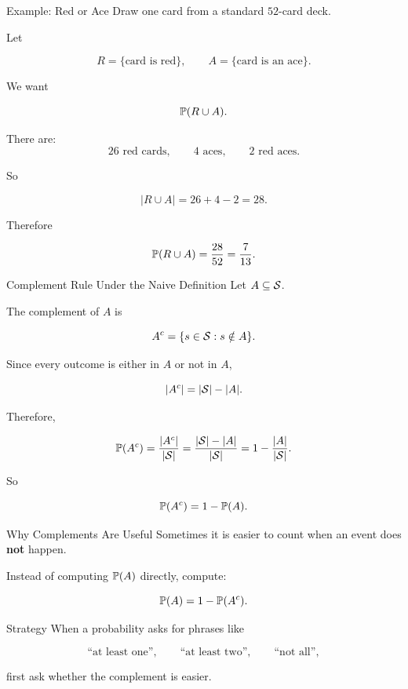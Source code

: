 \begin{frame}{Example: Red or Ace}
Draw one card from a standard $52$-card deck.

Let

\[
R = \{\text{card is red}\},
\qquad
A = \{\text{card is an ace}\}.
\]

We want

\[
\mathbb{P}(R \cup A).
\]

\vspace{0.2cm}

There are:
\[
26 \text{ red cards},
\qquad
4 \text{ aces},
\qquad
2 \text{ red aces}.
\]

So

\[
|R \cup A|
=
26 + 4 - 2
=
28.
\]

Therefore

\[
\mathbb{P}(R \cup A)
=
\frac{28}{52}
=
\frac{7}{13}.
\]
\end{frame}



\begin{frame}{Complement Rule Under the Naive Definition}
Let $A \subseteq \mathcal{S}$.

The complement of $A$ is

\[
A^c = \{s \in \mathcal{S} : s \notin A\}.
\]

Since every outcome is either in $A$ or not in $A$,

\[
|A^c| = |\mathcal{S}| - |A|.
\]

Therefore,

\[
\mathbb{P}(A^c)
=
\frac{|A^c|}{|\mathcal{S}|}
=
\frac{|\mathcal{S}|-|A|}{|\mathcal{S}|}
=
1 - \frac{|A|}{|\mathcal{S}|}.
\]

So

\[
{\mathbb{P}(A^c)=1-\mathbb{P}(A).}
\]
\end{frame}

\begin{frame}{Why Complements Are Useful}
Sometimes it is easier to count when an event does \textbf{not} happen.

\vspace{0.25cm}

Instead of computing $\mathbb{P}(A)$ directly, compute:

\[
\mathbb{P}(A) = 1 - \mathbb{P}(A^c).
\]

\vspace{0.3cm}

\begin{keybox}{Strategy}
When a probability asks for phrases like

\[
\text{``at least one''}, \qquad \text{``at least two''}, \qquad \text{``not all''},
\]

first ask whether the complement is easier.
\end{keybox}
\end{frame}

